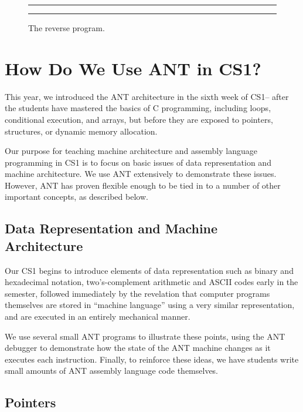 \begin{figure*}
\caption{ \label{reverse-asm} The reverse program.}
\vspace{3mm}
\hrule

{\small

}
\hrule
\end{figure*}

\section{How Do We Use ANT in CS1?}


This year, we introduced the ANT architecture in the sixth week of
CS1-- after the students have mastered the basics of C programming,
including loops, conditional execution, and arrays, but before they
are exposed to pointers, structures, or dynamic memory allocation.

Our purpose for teaching machine architecture and assembly language
programming in CS1 is to focus on basic issues of data representation
and machine architecture.  We use ANT extensively to demonstrate these
issues.  However, ANT has proven flexible enough to be tied in to a
number of other important concepts, as described below.

\subsection{Data Representation and Machine Architecture}

Our CS1 begins to introduce elements of data representation such as
binary and hexadecimal notation, two's-complement arithmetic and ASCII
codes early in the semester, followed immediately by the revelation
that computer programs themselves are stored in ``machine language''
using a very similar representation, and are executed in an entirely
mechanical manner.

We use several small ANT programs to illustrate these points, using
the ANT debugger to demonstrate how the state of the ANT machine
changes as it executes each instruction.  Finally, to reinforce these
ideas, we have students write small amounts of ANT assembly language
code themselves.

\subsection{Pointers}

